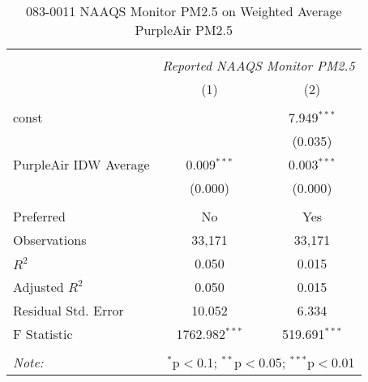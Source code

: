 \begin{table}[!htbp] \centering
  \caption{083-0011 NAAQS Monitor PM2.5 on Weighted Average PurpleAir PM2.5}
  \label{tab:reg_083-0011}
\begin{tabular}{@{\extracolsep{5pt}}lcc}
\\[-1.8ex]\hline
\hline \\[-1.8ex]
& \multicolumn{2}{c}{\textit{Reported NAAQS Monitor PM2.5}} \
\cr \cline{2-3}
\\[-1.8ex] & (1) & (2) \\
\hline \\[-1.8ex]
 const & & 7.949$^{***}$ \\
  & & (0.035) \\
 PurpleAir IDW Average & 0.009$^{***}$ & 0.003$^{***}$ \\
  & (0.000) & (0.000) \\
\hline \\[-1.8ex]
 Preferred & No & Yes \\
 Observations & 33,171 & 33,171 \\
 $R^2$ & 0.050 & 0.015 \\
 Adjusted $R^2$ & 0.050 & 0.015 \\
 Residual Std. Error & 10.052 & 6.334  \\
 F Statistic & 1762.982$^{***}$  & 519.691$^{***}$  \\
\hline
\hline \\[-1.8ex]
\textit{Note:} & \multicolumn{2}{r}{$^{*}$p$<$0.1; $^{**}$p$<$0.05; $^{***}$p$<$0.01} \\
\end{tabular}
\end{table}